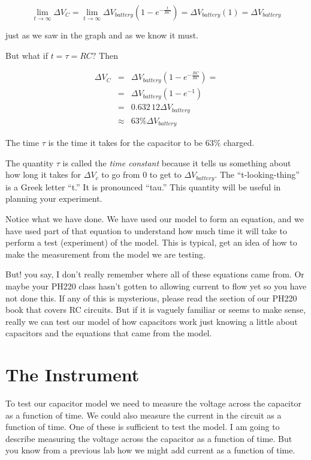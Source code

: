 \begin{equation*}
	\underset{t\rightarrow \infty }{\lim }\Delta V_{C}=\underset{t\rightarrow\infty }{\lim }\Delta V_{battery}\left( 1-e^{-\frac{t}{RC}}\right) =\Delta V_{battery}\left( 1\right) =\Delta V_{battery}
\end{equation*}

\noindent just as we saw in the graph and as we know it must.

But what if $t=\tau =RC?$ Then 

\begin{eqnarray*}
	\Delta V_{C} &=&\Delta V_{battery}\left( 1-e^{-\frac{RC}{RC}}\right) = \\
	             &=&\Delta V_{battery}\left( 1-e^{-1}\right) \\
	             &=&\allowbreak 0.632\,12\Delta V_{battery} \\
	             &\approx &63\%\Delta V_{battery}
\end{eqnarray*}

The time $\tau $ is the time it takes for the capacitor to be $63\%$ charged.

The quantity $\tau $ is called the \emph{time constant} because it tells us something about how long it takes for $\Delta V_{c}$ to go from $0$ to get to $\Delta V_{battery}.$ The ``t-looking-thing'' is a Greek letter ``t.'' It is pronounced ``tau.'' This quantity will be useful in planning your experiment.

Notice what we have done. We have used our model to form an equation, and we have used part of that equation to understand how much time it will take to perform a test (experiment) of the model. This is typical, get an idea of how to make the measurement from the model we are testing.

But! you say, I don't really remember where all of these equations came from. Or maybe your PH220 class hasn't gotten to allowing current to flow yet so you have not done this. If any of this is mysterious, please read the section of our PH220 book that covers RC circuits. But if it is vaguely familiar or seems to make sense, really we can test our model of how capacitors work just knowing a little about capacitors and the equations that came from the model.

\section{The Instrument}

To test our capacitor model we need to measure the voltage across the capacitor as a function of time. We could also measure the current in the circuit as a function of time. One of these is sufficient to test the model. I am going to describe measuring the voltage across the capacitor as a function of time. But you know from a previous lab how we might add current as a function of time.

